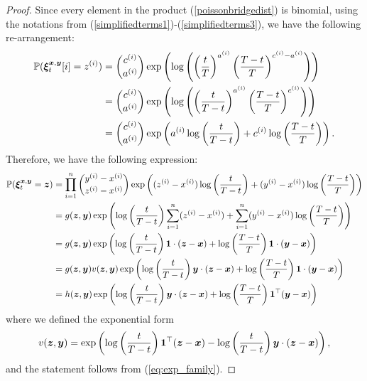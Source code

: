 \documentclass{article}
\def\tp{\top}
\def\xib{\boldsymbol{\xi}}
\theoremstyle{definition}
\begin{document}
\begin{proof}
Since every element in the product (\ref{poissonbridgedist}) is binomial, using the notations from (\ref{simplifiedterms1})-(\ref{simplifiedterms3}), we have the following re-arrangement:
\begin{align}
\mathbb{P}(\xib^{\boldsymbol{x},\boldsymbol{y}}_t[i] = z^{(i)}) &= {{c^{(i)}}\choose{a^{(i)}}} \exp\left( \log\left(  \left(\frac{t}{T}\right)^{a^{(i)}} \left(\frac{T-t}{T}\right)^{c^{(i)} - a^{(i)}} \right) \right) \notag \\
&= {{c^{(i)}}\choose{a^{(i)}}} \exp\left( \log\left(  \left(\frac{t}{T-t}\right)^{a^{(i)}} \left(\frac{T-t}{T}\right)^{c^{(i)}} \right) \right) \notag \\
&= {{c^{(i)}}\choose{a^{(i)}}} \exp\left( a^{(i)}\log\left( \frac{t}{T-t} \right) + c^{(i)}\log\left(\frac{T-t}{T}\right) \right).
\end{align}
Therefore, we have the following expression:
\begin{align}
\mathbb{P}(\xib^{\boldsymbol{x},\boldsymbol{y}}_t = \boldsymbol{z}) &= \prod_{i=1}^n {{y^{(i)} - x^{(i)}}\choose{z^{(i)} - x^{(i)}}} \exp\left( (z^{(i)} - x^{(i)})\log\left( \frac{t}{T-t} \right) + (y^{(i)} - x^{(i)})\log\left(\frac{T-t}{T}\right) \right) \notag \\
&= g(\boldsymbol{z},\boldsymbol{y}) \exp\left(\log\left( \frac{t}{T-t} \right)\sum_{i=1}^n (z^{(i)} - x^{(i)}) + \sum_{i=1}^n(y^{(i)} - x^{(i)})\log\left(\frac{T-t}{T}\right) \right) \notag \\
&= g(\boldsymbol{z},\boldsymbol{y}) \exp\left(\log\left(\frac{t}{T-t} \right)\mathbf{1} \cdot (\boldsymbol{z} - \boldsymbol{x}) + \log\left(\frac{T-t}{T}\right)\mathbf{1}\cdot (\boldsymbol{y} - \boldsymbol{x}) \right) \notag \\
&= g(\boldsymbol{z},\boldsymbol{y})v(\boldsymbol{z},\boldsymbol{y}) \exp\left(\log\left(\frac{t}{T-t} \right)\boldsymbol{y} \cdot (\boldsymbol{z} - \boldsymbol{x}) + \log\left(\frac{T-t}{T}\right)\mathbf{1}\cdot (\boldsymbol{y} - \boldsymbol{x}) \right) \notag \\
&= h(\boldsymbol{z},\boldsymbol{y}) \exp\left(\log\left(\frac{t}{T-t} \right)\boldsymbol{y} \cdot (\boldsymbol{z} - \boldsymbol{x}) + \log\left(\frac{T-t}{T}\right) \boldsymbol{1}^{\tp}(\boldsymbol{y} - \boldsymbol{x}) \right) \notag
\end{align}
where we defined the exponential form
\begin{align}
v(\boldsymbol{z},\boldsymbol{y}) = \exp\left(\log\left(\frac{t}{T-t} \right) \boldsymbol{1}^{\tp}(\boldsymbol{z} - \boldsymbol{x}) - \log\left(\frac{t}{T-t} \right)\boldsymbol{y} \cdot (\boldsymbol{z} - \boldsymbol{x}) \right), \notag
\end{align}
and the statement follows from (\ref{eq:exp_family}).
\end{proof}
\end{document}
